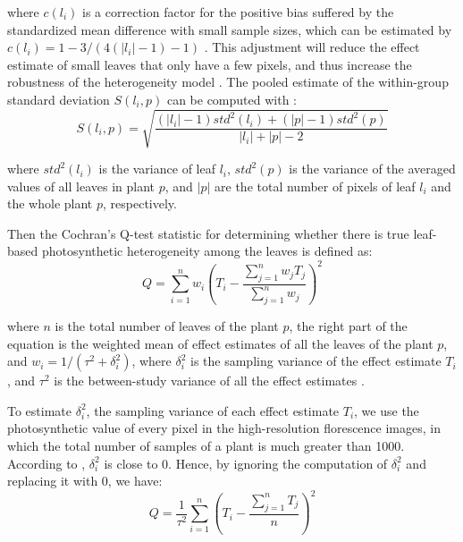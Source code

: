 \documentclass{bioinfo}
\begin{document}
{\begin{methods}
\noindent where $c(l_i)$ is a correction factor for the positive bias suffered by the standardized mean difference with small sample sizes, which can be estimated by $c(l_i) = 1-3/(4(|l_i|-1)-1)$ \citep{hedge1985statistical}. This adjustment will reduce the effect estimate of small leaves that only have a few pixels, and thus increase the robustness of the heterogeneity model \citep{huedo2006assessing}.
%
%
The pooled estimate of the within-group standard deviation $S(l_i, p)$ can be computed with \citep{hedges1998fixed}:
%
\begin{equation}\label{eq:S}
S(l_i, p) = \sqrt{\frac{(|l_i|-1)std^2(l_i)+(|p|-1)std^2(p)}{|l_i|+|p|-2}}
\end{equation}

\noindent where $std^2(l_i)$ is the variance of leaf $l_i$, $std^2(p)$ is  the variance of the averaged values of all leaves in plant $p$, and $|p|$ are the total number of pixels of leaf $l_i$ and the whole plant $p$, respectively.

%

Then the Cochran's Q-test statistic for determining whether there is true leaf-based photosynthetic heterogeneity among the leaves is defined as:
%
\begin{equation}\label{eq:Q}
Q=\sum_{i=1}^n w_i\left(T_i-\frac{\sum_{j=1}^n w_jT_j}{\sum_{j=1}^n w_j}\right)^2
\end{equation}

\noindent where $n$ is the total number of leaves of the plant $p$,  the right part of the equation is the weighted mean of effect estimates of all the leaves of the plant $p$, and $w_i=1/(\tau^2+\delta_i^2)$, where $\delta_i^2$ is the sampling variance of the effect estimate $T_i$, and $\tau^2$ is the between-study variance of all the effect estimates \citep{huedo2006assessing}.

To estimate $\delta_i^2$, the sampling variance of each effect estimate $T_i$, we use the photosynthetic value of every pixel in the high-resolution florescence images, in which the total number of samples of a plant is much greater than 1000. According to \citep{huedo2006assessing}, $\delta_i^2$ is close to 0. Hence, by ignoring the computation of  $\delta_i^2$ and replacing it with 0, we have:
%
\begin{equation}\label{eq:Q2}
Q=\frac{1}{\tau^2}\sum_{i=1}^n\left(T_i-\frac{\sum_{j=1}^n T_j}{n}\right)^2
\end{equation}


\end{methods}}
\end{document}
